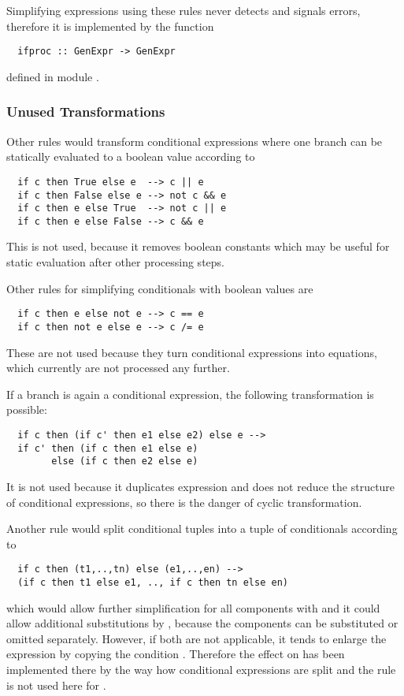 Simplifying  expressions using these rules never detects and signals errors, therefore it is implemented by the function
\begin{verbatim}
  ifproc :: GenExpr -> GenExpr
\end{verbatim}
defined in module .

\subsubsection{Unused Transformations}

Other rules would transform conditional expressions where one branch can be statically evaluated to a boolean value according to
\begin{verbatim}
  if c then True else e  --> c || e
  if c then False else e --> not c && e
  if c then e else True  --> not c || e
  if c then e else False --> c && e
\end{verbatim}
This is not used, because it removes boolean constants which may be useful for static evaluation after other processing steps.

Other rules for simplifying conditionals with boolean values are
\begin{verbatim}
  if c then e else not e --> c == e
  if c then not e else e --> c /= e
\end{verbatim}
These are not used because they turn conditional expressions into equations, which currently are not processed any further.

If a branch is again a conditional expression, the following transformation is possible:
\begin{verbatim}
  if c then (if c' then e1 else e2) else e -->
  if c' then (if c then e1 else e)
        else (if c then e2 else e)
\end{verbatim}
It is not used because it duplicates expression  and does not reduce the structure of conditional expressions,
so there is the danger of cyclic transformation.

Another rule would split conditional tuples into a tuple of conditionals according to
\begin{verbatim}
  if c then (t1,..,tn) else (e1,..,en) --> 
  (if c then t1 else e1, .., if c then tn else en)
\end{verbatim}
which would allow further simplification for all components with  and it could allow additional substitutions
by , because the components can be substituted or omitted separately. However, if both are not applicable, it 
tends to enlarge the expression by copying the condition . Therefore the effect on  has been implemented
there by the way how conditional expressions are split and the rule is not used here for .

